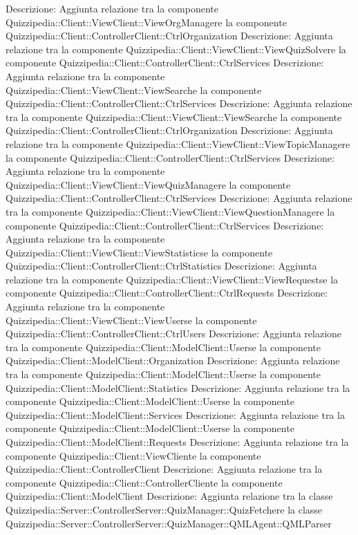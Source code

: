Descrizione: Aggiunta relazione tra la componente Quizzipedia::Client::ViewClient::ViewOrgManagere la componente Quizzipedia::Client::ControllerClient::CtrlOrganization 
Descrizione: Aggiunta relazione tra la componente Quizzipedia::Client::ViewClient::ViewQuizSolvere la componente Quizzipedia::Client::ControllerClient::CtrlServices 
Descrizione: Aggiunta relazione tra la componente Quizzipedia::Client::ViewClient::ViewSearche la componente Quizzipedia::Client::ControllerClient::CtrlServices 
Descrizione: Aggiunta relazione tra la componente Quizzipedia::Client::ViewClient::ViewSearche la componente Quizzipedia::Client::ControllerClient::CtrlOrganization 
Descrizione: Aggiunta relazione tra la componente Quizzipedia::Client::ViewClient::ViewTopicManagere la componente Quizzipedia::Client::ControllerClient::CtrlServices 
Descrizione: Aggiunta relazione tra la componente Quizzipedia::Client::ViewClient::ViewQuizManagere la componente Quizzipedia::Client::ControllerClient::CtrlServices 
Descrizione: Aggiunta relazione tra la componente Quizzipedia::Client::ViewClient::ViewQuestionManagere la componente Quizzipedia::Client::ControllerClient::CtrlServices 
Descrizione: Aggiunta relazione tra la componente Quizzipedia::Client::ViewClient::ViewStatisticse la componente Quizzipedia::Client::ControllerClient::CtrlStatistics 
Descrizione: Aggiunta relazione tra la componente Quizzipedia::Client::ViewClient::ViewRequestse la componente Quizzipedia::Client::ControllerClient::CtrlRequests 
Descrizione: Aggiunta relazione tra la componente Quizzipedia::Client::ViewClient::ViewUserse la componente Quizzipedia::Client::ControllerClient::CtrlUsers 
Descrizione: Aggiunta relazione tra la componente Quizzipedia::Client::ModelClient::Userse la componente Quizzipedia::Client::ModelClient::Organization 
Descrizione: Aggiunta relazione tra la componente Quizzipedia::Client::ModelClient::Userse la componente Quizzipedia::Client::ModelClient::Statistics 
Descrizione: Aggiunta relazione tra la componente Quizzipedia::Client::ModelClient::Userse la componente Quizzipedia::Client::ModelClient::Services 
Descrizione: Aggiunta relazione tra la componente Quizzipedia::Client::ModelClient::Userse la componente Quizzipedia::Client::ModelClient::Requests 
Descrizione: Aggiunta relazione tra la componente Quizzipedia::Client::ViewCliente la componente Quizzipedia::Client::ControllerClient 
Descrizione: Aggiunta relazione tra la componente Quizzipedia::Client::ControllerCliente la componente Quizzipedia::Client::ModelClient 
Descrizione: Aggiunta relazione tra la classe Quizzipedia::Server::ControllerServer::QuizManager::QuizFetchere la classe Quizzipedia::Server::ControllerServer::QuizManager::QMLAgent::QMLParser 
